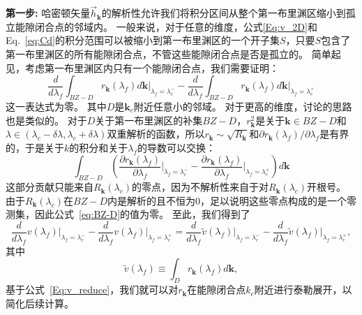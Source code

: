 			{\bf 第一步:}
			哈密顿矢量${\vec{h}}_{\mathbf{k}}$的解析性允许我们将积分区间从整个第一布里渊区缩小到孤立能隙闭合点的邻域内。
			一般来说，对于任意的维度，公式\eqref{Eq:v_2D}和Eq.~\eqref{eq:Cd}的积分范围可以被缩小到第一布里渊区的一个开子集$S$，只要$S$包含了第一布里渊区的所有能隙闭合点，不管这些能隙闭合点是否是孤立的。
			简单起见，考虑第一布里渊区内只有一个能隙闭合点，我们需要证明：
			\begin{equation}\label{eq:BZ-D}
				\frac{d}{d\lambda_f} \int_{BZ-D} r_\mathbf{k}(\lambda_f) d\mathbf{k} \bigg|_{\lambda_f=\lambda_c^-} - \frac{d}{d\lambda_f} \int_{BZ-D} r_\mathbf{k}(\lambda_f) d\mathbf{k} \bigg|_{\lambda_f=\lambda_c^+}
			\end{equation}
			这一表达式为零。
			其中$D$是$\mathbf{k}_c$附近任意小的邻域。
			对于更高的维度，讨论的思路也是类似的。
			对于$D$关于第一布里渊区的补集$BZ-D$，$r_\mathbf{k}^2$是关于$\mathbf{k} \in BZ-D$和$\lambda \in (\lambda_c-\delta \lambda, \lambda_c+\delta \lambda)$双重解析的函数，所以$r_\mathbf{k} \sim \sqrt{R_\mathbf{k}}$和${\partial r_\mathbf{k}(\lambda_f)}/{\partial \lambda_f}$是有界的，于是关于$k$的积分和关于$\lambda_f$的导数可以交换：
			\begin{equation}
				\int_{BZ-D} \left(\frac{\partial r_\mathbf{k}(\lambda_f)}{\partial\lambda_f}  \bigg|_{\lambda_f = \lambda_c^-} - \frac{\partial r_\mathbf{k}(\lambda_f)}{\partial\lambda_f} \bigg|_{\lambda_f=\lambda_c^+}\right) d\mathbf{k}
			\end{equation}
			这部分贡献只能来自$R_\mathbf{k}(\lambda_c)$的零点，因为不解析性来自于对$R_\mathbf{k}(\lambda_c)$开根号。
			由于$R_\mathbf{k}(\lambda_c)$在$BZ-D$内是解析的且不恒为0，足以说明这些零点构成的是一个零测集，因此公式~\eqref{eq:BZ-D}的值为零。
			至此，我们得到了
			\begin{equation}
				\frac{d}{d\lambda_f} v(\lambda_f) \bigg|_{\lambda_f=\lambda_c^-} - \frac{d}{d\lambda_f} v(\lambda_f) \bigg|_{\lambda_f=\lambda_c^+}=\frac{d}{d\lambda_f} \tilde{v}(\lambda_f) \bigg|_{\lambda_f=\lambda_c^-} - \frac{d}{d\lambda_f} \tilde{v}(\lambda_f) \bigg|_{\lambda_f=\lambda_c^+},
			\end{equation}
			其中
			\begin{equation}\label{Eq:v_reduce}
				\tilde{v}(\lambda_f) \equiv \int_{D}{r_\mathbf{k}(\lambda_f) d\mathbf{k}},
			\end{equation}
			基于公式~\eqref{Eq:v_reduce}，我们就可以对$r_\mathbf{k}$在能隙闭合点$k_c$附近进行泰勒展开，以简化后续计算。
			
